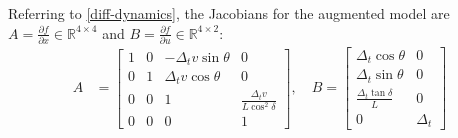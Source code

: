 \documentclass{article}
\begin{document}
Referring to \eqref{diff-dynamics}, the Jacobians for the augmented model are $A = \frac{\partial f}{\partial x} \in \mathbb{R}^{4 \times 4}$ and $B = \frac{\partial f}{\partial u} \in \mathbb{R}^{4 \times 2}$:
\begin{equation}
\begin{aligned}
    A & = \begin{bmatrix}
        1 & 0 & -\Delta_t v \sin{\theta} & 0 \\
        0 & 1 &  \Delta_t v \cos{\theta} & 0 \\
        0 & 0 & 1 & \frac{\Delta_t v}{L\cos^2{\delta}} \\
        0 & 0 & 0 & 1
    \end{bmatrix}, \quad
    B = \begin{bmatrix}
        \Delta_t \cos{\theta} & 0 \\
        \Delta_t \sin{\theta} & 0 \\
        \frac{\Delta_t \tan{\delta}}{L} & 0 \\
        0 & \Delta_t
    \end{bmatrix}
\end{aligned}
\end{equation}
\end{document}
